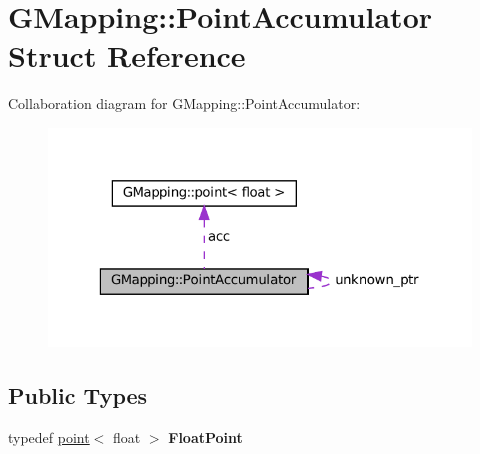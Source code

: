 \hypertarget{structGMapping_1_1PointAccumulator}{}\section{G\+Mapping\+:\+:Point\+Accumulator Struct Reference}
\label{structGMapping_1_1PointAccumulator}


Collaboration diagram for G\+Mapping\+:\+:Point\+Accumulator\+:
\nopagebreak
\begin{figure}[H]
\begin{center}
\leavevmode
\includegraphics[width=323pt]{structGMapping_1_1PointAccumulator__coll__graph}
\end{center}
\end{figure}
\subsection*{Public Types}
\begin{DoxyCompactItemize}
\item 
\mbox{\label{structGMapping_1_1PointAccumulator_aa256b887e57057b22cc726d0b708e63f}} 
typedef \hyperlink{structGMapping_1_1point}{point}$<$ float $>$ {\bfseries Float\+Point}
\end{DoxyCompactItemize}
